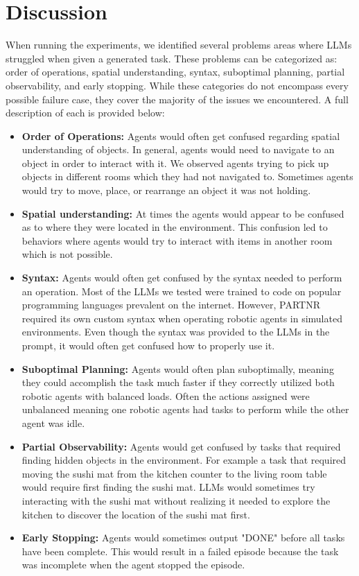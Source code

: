 \section{Discussion}

When running the experiments, we identified several problems areas where LLMs struggled when given a generated task.  These problems can be categorized as: order of operations, spatial understanding, syntax, suboptimal planning, partial observability, and early stopping.  While these categories do not encompass every possible failure case, they cover the majority of the issues we encountered.  A full description of each is provided below:

\begin{itemize}
      \item \textbf{Order of Operations:}
            Agents would often get confused regarding spatial understanding of objects.  In general, agents would need to navigate to an object in order to interact with it.  We observed agents trying to pick up objects in different rooms which they had not navigated to.  Sometimes agents would try to move, place, or rearrange an object it was not holding.
      \item \textbf{Spatial understanding:}
            At times the agents would appear to be confused as to where they were located in the environment.  This confusion led to behaviors where agents would try to interact with items in another room which is not possible.
      \item \textbf{Syntax:}
            Agents would often get confused by the syntax needed to perform an operation.  Most of the LLMs we tested were trained to code on popular programming languages prevalent on the internet.  However, PARTNR required its own custom syntax when operating robotic agents in simulated environments.  Even though the syntax was provided to the LLMs in the prompt, it would often get confused how to properly use it.
      \item \textbf{Suboptimal Planning:}
            Agents would often plan suboptimally, meaning they could accomplish the task much faster if they correctly utilized both robotic agents with balanced loads.  Often the actions assigned were unbalanced meaning one robotic agents had tasks to perform while the other agent was idle.
      \item \textbf{Partial Observability:}
            Agents would get confused by tasks that required finding hidden objects in the environment.  For example a task that required moving the sushi mat from the kitchen counter to the living room table would require first finding the sushi mat.  LLMs would sometimes try interacting with the sushi mat without realizing it needed to explore the kitchen to discover the location of the sushi mat first.
      \item \textbf{Early Stopping:}
            Agents would sometimes output "DONE" before all tasks have been complete.  This would result in a failed episode because the task was incomplete when the agent stopped the episode.
\end{itemize}

